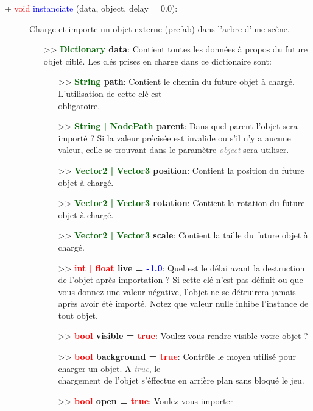 \documentclass[a4paper, 11pt]{article}
\begin{document}
	\begin{description}
		\item [+ \textcolor{red}{void} \textcolor{blue}{\hypertarget{instanciate}{instanciate}} (data, 
		object, delay = 0.0):] Charge et importe un objet externe (prefab) dans l'arbre d'une scène.
		\begin{itemize}
			\item [>> \textbf{\textcolor{darkgreen}{Dictionary} data}:] Contient toutes les données à propos 
			du future objet ciblé. Les clés prises en charge dans ce dictionaire sont:
			\begin{itemize}
				\item[>> \textbf{\textcolor{darkgreen}{String} path}:] Contient le chemin du future objet à 
				chargé. L'utilisation de cette clé est \\obligatoire.
				\item[>> \textbf{\textcolor{darkgreen}{String | NodePath} parent}:] Dans quel parent l'objet 
				sera importé ? Si la valeur précisée est invalide ou s'il n'y a aucune valeur, celle se
				trouvant dans le paramètre \textit{\textcolor{gray}{object}} sera utiliser.
				\item[>> \textbf{\textcolor{darkgreen}{Vector2 | Vector3} position}:] Contient la position 
				du future objet à chargé.
				\item[>> \textbf{\textcolor{darkgreen}{Vector2 | Vector3} rotation}:] Contient la rotation 
				du future objet à chargé.
				\item[>> \textbf{\textcolor{darkgreen}{Vector2 | Vector3} scale}: ] Contient la taille du 
				future objet à chargé.
				\item[>> \textbf{\textcolor{red}{int | float} live = \textcolor{blue}{-1.0}}:] Quel est le 
				délai avant la destruction de l'objet après importation ? Si cette clé n'est pas définit ou
				que vous donnez une valeur négative, l'objet ne se détruirera jamais après avoir été 
				importé. Notez que valeur nulle inhibe l'instance de tout objet.
				\item[>> \textbf{\textcolor{red}{bool} visible = \textcolor{red}{true}}:] Voulez-vous rendre 
				visible votre objet ?
				\item[>> \textbf{\textcolor{red}{bool} background = \textcolor{red}{true}}:] Contrôle le 
				moyen utilisé pour charger un objet. A \textit{\textcolor{gray}{true}}, le \\chargement de 
				l'objet s'éffectue en arrière plan sans bloqué le jeu.
				\item[>> \textbf{\textcolor{red}{bool} open = \textcolor{red}{true}}:] Voulez-vous importer 

\end{itemize}
\end{itemize}
\end{description}
\end{document}
